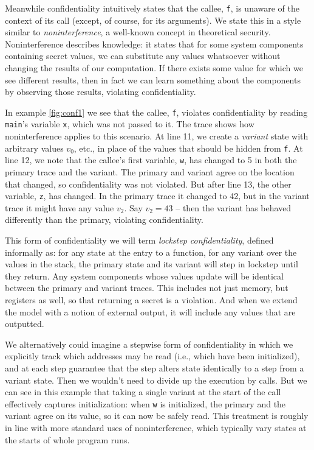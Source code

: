 \documentclass[acmsmall,review,anonymous]{acmart}\settopmatter{printfolios=true,printccs=false,printacmref=false}
\begin{document}
Meanwhile confidentiality intuitively states that the callee, {\tt f}, is unaware
of the context of its call (except, of course, for its arguments).
We state this in a style similar to {\em noninterference}, a well-known concept in theoretical
security. Noninterference describes knowledge: it states that for some system components
containing secret values, we can substitute any values whatsoever without changing the results
of our computation. If there exists some value for which we see different results, then
in fact we can learn something about the components by observing those results, violating
confidentiality.

In example \ref{fig:conf1} we see that the callee, {\tt f}, violates confidentiality
by reading {\tt main}'s variable {\tt x}, which was not passed to it. The trace
shows how noninterference applies to this scenario. At line 11, we create a {\em variant}
state with arbitrary values \(v_0\), etc., in place of the values that should
be hidden from {\tt f}. At line 12, we note that the callee's first variable, {\tt w}, has
changed to 5 in both the primary trace and the variant. The primary and variant agree on
the location that changed, so confidentiality was not violated. But after line 13,
the other variable, {\tt z}, has changed. In the primary trace it changed to 42, but
in the variant trace it might have any value \(v_2\). Say \(v_2 = 43\) -- then the variant
has behaved differently than the primary, violating confidentiality.

This form of confidentiality we will term {\em lockstep confidentiality}, defined informally
as: for any state at the entry to a function, for any variant over the values in the stack,
the primary state and its variant will step in lockstep until they return. Any system components
whose values update will be identical between the primary and variant traces. This includes not
just memory, but registers as well, so that returning a secret is a violation. And when we extend
the model with a notion of external output, it will include any values that are outputted.

We alternatively could imagine a stepwise form of confidentiality in which we explicitly
track which addresses may be read (i.e., which have been initialized), and at each step
guarantee that the step alters state identically to a step from a variant state. Then we
wouldn't need to divide up the execution by calls. But we can see in this example that taking
a single variant at the start of the call effectively captures initialization: when {\tt w} is
initialized, the primary and the variant agree on its value, so it can now be safely read.
This treatment is roughly in line with more standard uses of noninterference, which typically
vary states at the starts of whole program runs.
\end{document}
